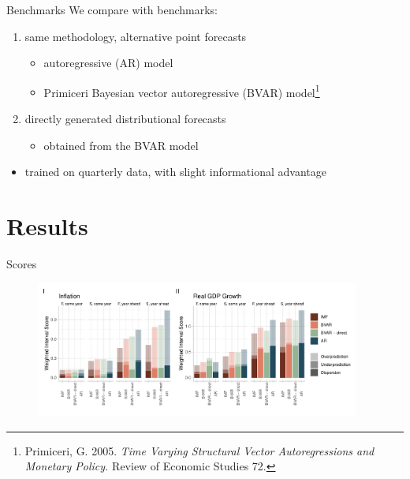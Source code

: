 \documentclass[en]{sdqbeamer}
\begin{document}
\begin{frame}{Benchmarks}
    We compare with benchmarks:
\begin{enumerate}
    \item same methodology, alternative point forecasts
    \begin{itemize}
        \item autoregressive (AR) model
        \item Primiceri Bayesian vector autoregressive (BVAR) model\footnote{Primiceri, G. 2005. \textit{Time Varying Structural Vector Autoregressions and Monetary Policy.} Review of Economic Studies 72.}
    \end{itemize}
    \item directly generated distributional forecasts
    \begin{itemize}
        \item obtained from the BVAR model
    \end{itemize}
\end{enumerate}
\begin{itemize}
    \item trained on quarterly data, with slight informational advantage
\end{itemize}

\end{frame}

\section{Results}
\begin{frame}{Scores }
    \begin{figure}
        \centering
        \includegraphics[width=0.95\textwidth]{figures/wis_cpigdp.pdf} 
        \label{fig:enter-label}
    \end{figure} 
\end{frame}
\end{document}
